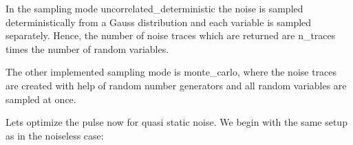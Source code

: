 \documentclass[letterpaper,10pt,english]{sphinxmanual}
\begin{document}
In the sampling mode uncorrelated\_deterministic the noise is sampled deterministically from a Gauss distribution and each variable is sampled separately. Hence, the number of noise traces which are returned are n\_traces times the number of random variables.

The other implemented sampling mode is monte\_carlo, where the noise traces are created with help of random number generators and all random variables are sampled at once.

Lets optimize the pulse now for quasi static noise. We begin with the same setup as in the noiseless case:

{
\begin{sphinxVerbatim}[commandchars=\\\{\}]
\llap{\color{nbsphinxin}[2]:\,\hspace{\fboxrule}\hspace{\fboxsep}}   

   
   
   


  \PYG{p}{[}\PYG{p}{[} \PYG{p}{]} \PYG{p}{[} \PYG{p}{]}\PYG{p}{]}
  \PYG{p}{[}\PYG{p}{[} \PYG{p}{]} \PYG{p}{[} \PYG{p}{]}\PYG{p}{]}
  \PYG{p}{[}\PYG{p}{[} \PYG{p}{]} \PYG{p}{[} \PYG{p}{]}\PYG{p}{]}
  \PYG{p}{[}\PYG{p}{[} \PYG{p}{]} \PYG{p}{[} \PYG{p}{]}\PYG{p}{]}


\end{sphinxVerbatim}}
\end{document}
